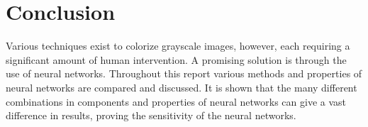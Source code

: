 \section{Conclusion}

Various techniques exist to colorize grayscale images, however, each requiring a significant amount of human intervention. A promising solution is through the use of neural networks. Throughout this report various methods and properties of neural networks are compared and discussed. It is shown that the many different combinations in components and properties of neural networks can give a vast difference in results, proving the sensitivity of the neural networks. 